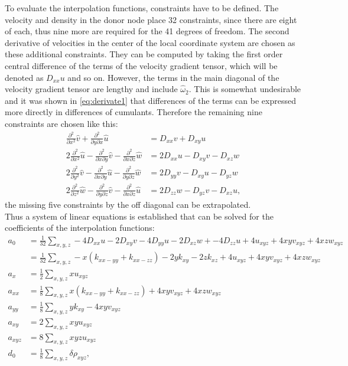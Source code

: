 To evaluate the interpolation functions, constraints have to be defined. The velocity and density in the donor node place 32 constraints, since there are eight of each, thus nine more are required for the 41 degrees of freedom. The second derivative of velocities in the center of the local coordinate system are chosen as these additional constraints. They can be computed by taking the first order central difference of the terms of the velocity gradient tensor, which will be denoted as $D_{xx} u$ and so on. However, the terms in the main diagonal of the velocity gradient tensor are lengthy and include $\hat{\omega}_2$. This is somewhat undesirable and it was shown in \eqref{eq:derivate1} that differences of the terms can be expressed more directly in differences of cumulants. Therefore the remaining nine constraints are chosen like this:
\begin{align}
\frac{\partial^2}{\partial x^2} \hat{v}+\frac{\partial^2}{\partial y \partial x} \hat{u} &= D_{xx} v + D_{xy} u \label{eq:const1} \\
2\frac{\partial^2}{\partial x^2} \hat{u} - \frac{\partial^2}{\partial x \partial y} \hat{v} - \frac{\partial^2}{\partial x \partial z} \hat{w} &= 2 D_{xx}u- D_{xy}v - D_{xz}w \\
2\frac{\partial^2}{\partial y^2} \hat{v} - \frac{\partial^2}{\partial x \partial y} \hat{u} - \frac{\partial^2}{\partial y \partial z} \hat{w} &= 2 D_{yy}v- D_{xy}u - D_{yz}w \\
2\frac{\partial^2}{\partial z^2} \hat{w} - \frac{\partial^2}{\partial y \partial z} \hat{v} - \frac{\partial^2}{\partial x \partial z} \hat{u} &= 2 D_{zz}w- D_{yz}v - D_{xz}u, \label{eq:const2}
\end{align}
the missing five constraints by the off diagonal can be extrapolated. \\
Thus a system of linear equations is established that can be solved for the coefficients of the interpolation functions:
\begin{align}
a_0 &= \frac{1}{32} \sum_{x,y,z}  -4 D_{xx}u-2 D_{xy}v -4D_{yy}u- 2 D_{xz}w + -4 D_{zz}u + 4 u_{xyz} + 4xyv_{xyz} + 4 xzw_{xyz} \\
&= \frac{1}{32} \sum_{x,y,z}  -x\left(k_{xx-yy} + k_{xx-zz}\right) - 2yk_{xy} -2zk_{xz} + 4 u_{xyz} + 4xyv_{xyz} + 4 xzw_{xyz} \\
a_x &= \frac{1}{2} \sum_{x,y,z} x u_{xyz} \\
a_{xx} &= \frac{1}{8} \sum_{x,y,z}x\left(k_{xx-yy}+k_{xx-zz}\right) + 4xyv_{xyz}+ 4 xzw_{xyz} \\
a_{yy} &= \frac{1}{8} \sum_{x,y,z}y k_{xy} - 4 xy v_{xyz} \\
a_{xy} &= 2 \sum_{x,y,z} xyu_{xyz} \\
a_{xyz} &= 8 \sum_{x,y,z} xyzu_{xyz} \\
d_0 &= \frac{1}{8} \sum_{x,y,z} \delta \rho_{xyz},
\end{align}

